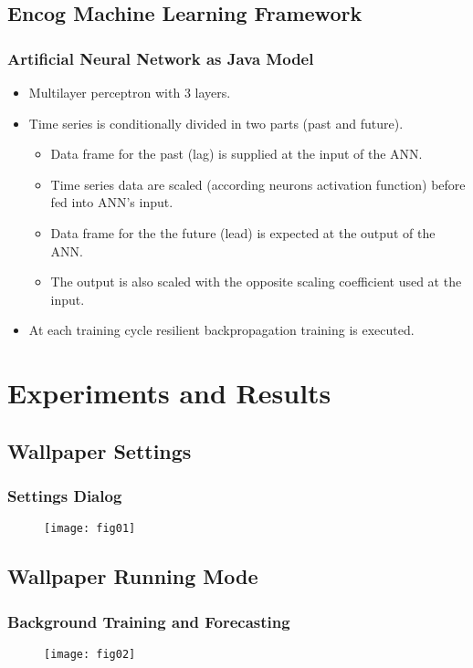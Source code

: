\documentclass{beamer}
\begin{document}
\subsection{Encog Machine Learning Framework}

\begin{frame}
\frametitle{Artificial Neural Network as Java Model}
\begin{itemize}
  \item Multilayer perceptron with 3 layers.
  \item Time series is conditionally divided in two parts (past and future).
  \begin{itemize}
    \item Data frame for the past (lag) is supplied at the input of the ANN.
    \item Time series data are scaled (according neurons activation function) before fed into ANN's input.
    \item Data frame for the the future (lead) is expected at the output of the ANN.
    \item The output is also scaled with the opposite scaling coefficient used at the input.
  \end{itemize}
  \item At each training cycle resilient backpropagation training is executed.
\end{itemize}
\end{frame}

\section{Experiments and Results}

\subsection{Wallpaper Settings}

\begin{frame}
\frametitle{Settings Dialog}
\begin{figure}[h]
  \centering
  \texttt{[image: fig01]}
\label{fig:01}
\end{figure}
\end{frame}

\subsection{Wallpaper Running Mode}

\begin{frame}
\frametitle{Background Training and Forecasting}
\begin{figure}[h]
  \centering
  \texttt{[image: fig02]}
\label{fig:02}
\end{figure}
\end{frame}
\end{document}
